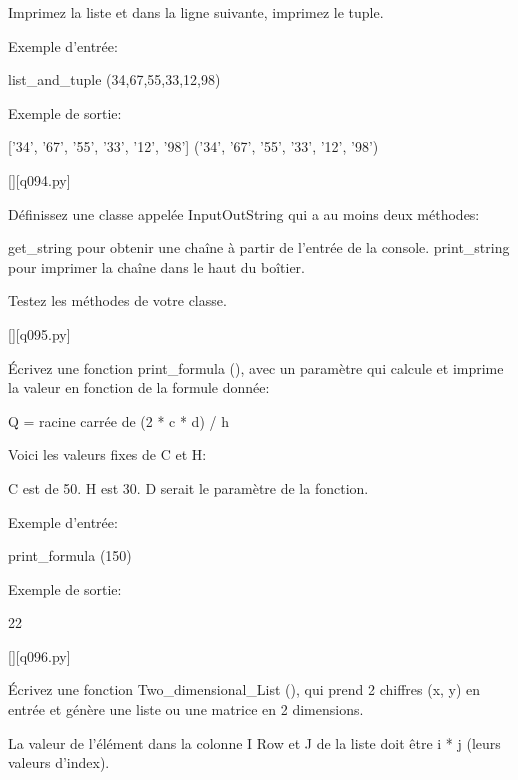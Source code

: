 Imprimez la liste et dans la ligne suivante, imprimez le tuple.

Exemple d'entrée:

list\_and\_tuple (34,67,55,33,12,98)

Exemple de sortie:

['34', '67', '55', '33', '12', '98']
('34', '67', '55', '33', '12', '98')
        \par
        \renewcommand{\nomfichier}{q094.py}
        \begin{solution}
            \pythonfile{\chemincode \nomfichier}[][\nomfichier]
        \end{solution}
        

        \question
        Définissez une classe appelée InputOutString qui a au moins deux méthodes:

get\_string pour obtenir une chaîne à partir de l'entrée de la console.
print\_string pour imprimer la chaîne dans le haut du boîtier.

Testez les méthodes de votre classe.
        \par
        \renewcommand{\nomfichier}{q095.py}
        \begin{solution}
            \pythonfile{\chemincode \nomfichier}[][\nomfichier]
        \end{solution}
        

        \question
        Écrivez une fonction print\_formula (), avec un paramètre qui calcule et imprime la valeur en fonction de la formule donnée:

Q = racine carrée de (2 * c * d) / h

Voici les valeurs fixes de C et H:

C est de 50.
H est 30.
D serait le paramètre de la fonction.

Exemple d'entrée:

print\_formula (150)

Exemple de sortie:

22
        \par
        \renewcommand{\nomfichier}{q096.py}
        \begin{solution}
            \pythonfile{\chemincode \nomfichier}[][\nomfichier]
        \end{solution}
        

        \question
        Écrivez une fonction Two\_dimensional\_List (), qui prend 2 chiffres (x, y) en entrée et génère une liste ou une matrice en 2 dimensions.

La valeur de l'élément dans la colonne I Row et J de la liste doit être i * j (leurs valeurs d'index).

